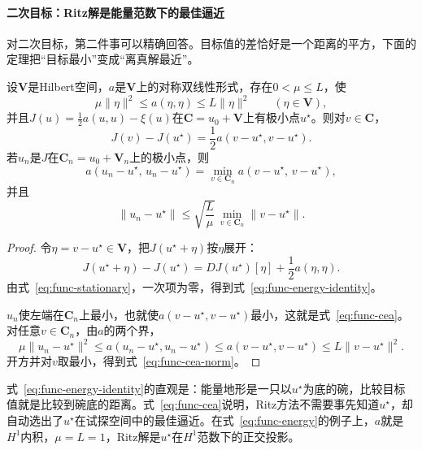 \paragraph{二次目标：Ritz解是能量范数下的最佳逼近}
对二次目标，第二件事可以精确回答。目标值的差恰好是一个距离的平方，下面的定理把“目标最小”变成“离真解最近”。

\begin{theorem}[Ritz方法的最佳逼近性质]
\label{thm:func-cea}
设$\bm{V}$是Hilbert空间，$a$是$\bm{V}$上的对称双线性形式，存在$0<\mu\leq L$，使
\begin{equation}
 \mu\lVert\eta\rVert^2\leq a(\eta,\eta)\leq L\lVert\eta\rVert^2\qquad(\eta\in\bm{V}),
 \label{eq:func-a-bounds}
\end{equation}
并且$J(u)=\frac12a(u,u)-\xi(u)$在$\bm{C}=u_0+\bm{V}$上有极小点$u^\star$。则对$v\in\bm{C}$，
\begin{equation}
 J(v)-J(u^\star)=\frac12a(v-u^\star,v-u^\star).
 \label{eq:func-energy-identity}
\end{equation}
若$u_n$是$J$在$\bm{C}_n=u_0+\bm{V}_n$上的极小点，则
\begin{equation}
 a(u_n-u^\star,\,u_n-u^\star)=\min_{v\in\bm{C}_n}a(v-u^\star,\,v-u^\star),
 \label{eq:func-cea}
\end{equation}
并且
\begin{equation}
 \lVert u_n-u^\star\rVert\leq\sqrt{\frac{L}{\mu}}\,\min_{v\in\bm{C}_n}\lVert v-u^\star\rVert.
 \label{eq:func-cea-norm}
\end{equation}
\end{theorem}

\begin{proof}
令$\eta=v-u^\star\in\bm{V}$，把$J(u^\star+\eta)$按$\eta$展开：
\[
 J(u^\star+\eta)-J(u^\star)=DJ(u^\star)[\eta]+\frac12a(\eta,\eta).
\]
由式~\eqref{eq:func-stationary}，一次项为零，得到式~\eqref{eq:func-energy-identity}。

$u_n$使左端在$\bm{C}_n$上最小，也就使$a(v-u^\star,v-u^\star)$最小，这就是式~\eqref{eq:func-cea}。对任意$v\in\bm{C}_n$，由$a$的两个界，
\[
 \mu\lVert u_n-u^\star\rVert^2\leq a(u_n-u^\star,u_n-u^\star)\leq a(v-u^\star,v-u^\star)\leq L\lVert v-u^\star\rVert^2.
\]
开方并对$v$取最小，得到式~\eqref{eq:func-cea-norm}。
\end{proof}

式~\eqref{eq:func-energy-identity}的直观是：能量地形是一只以$u^\star$为底的碗，比较目标值就是比较到碗底的距离。式~\eqref{eq:func-cea}说明，Ritz方法不需要事先知道$u^\star$，却自动选出了$u^\star$在试探空间中的最佳逼近。在式~\eqref{eq:func-energy}的例子上，$a$就是$H^1$内积，$\mu=L=1$，Ritz解是$u^\star$在$H^1$范数下的正交投影。

